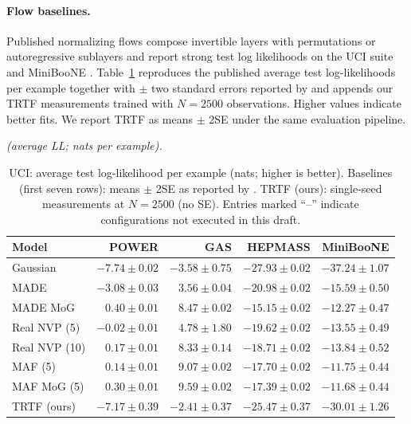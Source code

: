 \documentclass[11pt,a4paper,twoside]{book}\usepackage[]{graphicx}\usepackage[]{xcolor}
\begin{document}
\paragraph{Flow baselines.} Published normalizing flows compose invertible layers with permutations or autoregressive sublayers and report strong test log likelihoods on the UCI suite and MiniBooNE \citep{rezende2015variational,dinh2017real,kingma2018glow,durkan2019neural,papamakarios2021normalizing}. Table~\ref{tab:uci-loglik} reproduces the published average test log-likelihoods per example together with $\pm$ two standard errors reported by \citet{papamakarios2017masked} and appends our TRTF measurements trained with $N=2500$ observations. Higher values indicate better fits. We report TRTF as means $\pm$ 2SE under the same evaluation pipeline.

\begin{table}[htbp]
  \centering
  \textit{(average LL; nats per example).}
  \caption{UCI: average test log-likelihood per example (nats; higher is better). Baselines (first seven rows): means $\pm$ 2SE as reported by \citet{papamakarios2017masked}. TRTF (ours): single-seed measurements at $N=2500$ (no SE). Entries marked ``--'' indicate configurations not executed in this draft.}
  \label{tab:uci-loglik}
  \begin{tabular}{lrrrr}
    \hline
    Model & POWER & GAS & HEPMASS & MiniBooNE \\
    \hline
    Gaussian          & $-7.74 \pm 0.02$ & $-3.58 \pm 0.75$ & $-27.93 \pm 0.02$ & $-37.24 \pm 1.07$ \\
    MADE              & $-3.08 \pm 0.03$ & $ 3.56 \pm 0.04$ & $-20.98 \pm 0.02$ & $-15.59 \pm 0.50$ \\
    MADE MoG          & $ 0.40 \pm 0.01$ & $ 8.47 \pm 0.02$ & $-15.15 \pm 0.02$ & $-12.27 \pm 0.47$ \\
    Real NVP (5)      & $-0.02 \pm 0.01$ & $ 4.78 \pm 1.80$ & $-19.62 \pm 0.02$ & $-13.55 \pm 0.49$ \\
    Real NVP (10)     & $ 0.17 \pm 0.01$ & $ 8.33 \pm 0.14$ & $-18.71 \pm 0.02$ & $-13.84 \pm 0.52$ \\
    MAF (5)           & $ 0.14 \pm 0.01$ & $ 9.07 \pm 0.02$ & $-17.70 \pm 0.02$ & $-11.75 \pm 0.44$ \\
    MAF MoG (5)       & $ 0.30 \pm 0.01$ & $ 9.59 \pm 0.02$ & $-17.39 \pm 0.02$ & $-11.68 \pm 0.44$ \\
    TRTF (ours)    & $-7.17 \pm 0.39$ & $-2.41 \pm 0.37$ & $-25.47 \pm 0.37$ & $-30.01 \pm 1.26$ \\
    \hline
  \end{tabular}
\end{table}
\end{document}
